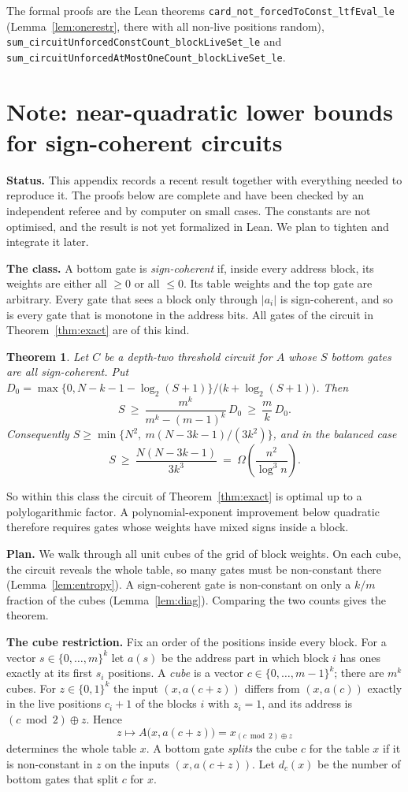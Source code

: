 \documentclass[11pt,letterpaper]{article}
\newtheorem{theorem}{Theorem}
\theoremstyle{remark}
\newcommand{\bits}{\{0,1\}}
\newcommand{\sect}[1]{\section{\texorpdfstring{\color{ink}#1}{#1}}}
\newcommand{\smalltitle}[1]{\textbf{\color{ink}#1}\quad}
\begin{document}
The formal proofs are the Lean theorems
\texttt{card\_not\_forcedToConst\_ltfEval\_le} (Lemma~\ref{lem:onerestr}, there
with all non-live positions random),
\texttt{sum\_circuitUnforcedConstCount\_blockLiveSet\_le} and
\texttt{sum\_circuitUnforcedAtMostOneCount\_blockLiveSet\_le}.

\sect{Note: near-quadratic lower bounds for sign-coherent circuits}\label{app:coherent}

\begin{keybox}
\textbf{Status.} This appendix records a recent result together with
everything needed to reproduce it. The proofs below are complete and have
been checked by an independent referee and by computer on small cases. The
constants are not optimised, and the result is not yet formalized in Lean.
We plan to tighten and integrate it later.
\end{keybox}

\smalltitle{The class.}
A bottom gate is \emph{sign-coherent} if, inside every address block, its
weights are either all $\ge0$ or all $\le0$. Its table weights and the top
gate are arbitrary. Every gate that sees a block only through $|a_i|$ is
sign-coherent, and so is every gate that is monotone in the address bits.
All gates of the circuit in Theorem~\ref{thm:exact} are of this kind.

\begin{theorem}\label{thm:coherent}
Let $C$ be a depth-two threshold circuit for $A$ whose $S$ bottom gates are
all sign-coherent. Put $D_0=\max\{0,N-k-1-\log_2(S+1)\}/\bigl(k+\log_2(S+1)\bigr)$. Then
\[
S\ \ge\ \frac{m^k}{m^k-(m-1)^k}\,D_0\ \ge\ \frac mk\,D_0 .
\]
Consequently $S\ge\min\{N^2,\ m(N-3k-1)/(3k^2)\}$, and in the balanced case
\[
S\ \ge\ \frac{N(N-3k-1)}{3k^3}\ =\ \Omega\!\left(\frac{n^2}{\log^3 n}\right).
\]
\end{theorem}

So within this class the circuit of Theorem~\ref{thm:exact} is optimal up to a
polylogarithmic factor. A polynomial-exponent improvement below quadratic therefore requires
gates whose weights have mixed signs inside a block.

\smalltitle{Plan.}
We walk through all unit cubes of the grid of block weights. On each cube,
the circuit reveals the whole table, so many gates must be non-constant there
(Lemma~\ref{lem:entropy}). A sign-coherent gate is non-constant on only a
$k/m$ fraction of the cubes (Lemma~\ref{lem:diag}). Comparing the two counts
gives the theorem.

\smalltitle{The cube restriction.}
Fix an order of the positions inside every block. For a vector
$s\in\{0,\dots,m\}^k$ let $a(s)$ be the address part in which block $i$ has
ones exactly at its first $s_i$ positions. A \emph{cube} is a vector
$c\in\{0,\dots,m-1\}^k$; there are $m^k$ cubes. For $z\in\bits^k$ the input
$(x,a(c+z))$ differs from $(x,a(c))$ exactly in the live positions
$c_i+1$ of the blocks $i$ with $z_i=1$, and its address is
$(c\bmod2)\oplus z$. Hence
\[
z\mapsto A\bigl(x,a(c+z)\bigr)=x_{(c\bmod 2)\oplus z}
\]
determines the whole table $x$. A bottom gate \emph{splits} the cube $c$ for
the table $x$ if it is non-constant in $z$ on the inputs $(x,a(c+z))$. Let
$d_c(x)$ be the number of bottom gates that split $c$ for $x$.
\end{document}
